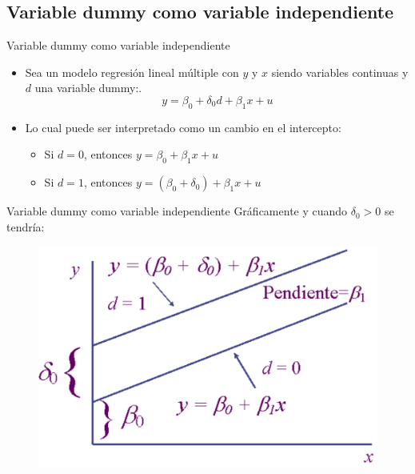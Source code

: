 \subsection{Variable dummy como variable independiente}
\begin{frame}{Variable dummy como variable independiente}
	\begin{itemize}
		\item Sea un modelo regresión lineal múltiple con $y$ y $x$ siendo variables continuas y $d$ una variable dummy:. 
		\pause
				$$y=\beta_{0}+\delta_{0}d+\beta_{1}x+u$$ 
		\pause
		\item Lo cual puede ser interpretado como un cambio en el intercepto: 
		\pause
		\begin{itemize}
			\item Si $d=0$, entonces $y=\beta_{0}+\beta_{1}x+u$
			\item Si $d=1$, entonces $y=(\beta_{0}+\delta_{0})+\beta_{1}x+u$
			\pause
		\end{itemize}
	\end{itemize}
\end{frame}
\begin{frame}{Variable dummy como variable independiente}
	Gráficamente y cuando $\delta_{0}>0$ se tendría:
    	\begin{figure}[H]
	    	\begin{centering}
	    	  \includegraphics[width = 0.8\linewidth]{fig/dummy1.png}
	    	\end{centering}
    	\end{figure}
\end{frame}
